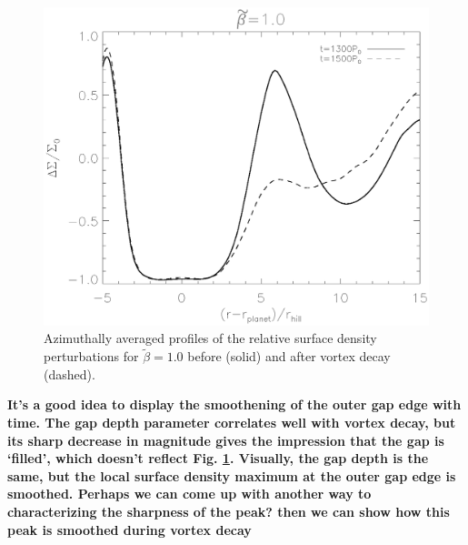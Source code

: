 \begin{figure}
  \includegraphics[width=\linewidth]{figures/gapchange}
  \caption{Azimuthally averaged profiles of the relative surface
    density perturbations for  $\tilde\beta=1.0$
    before (solid) and after vortex decay
    (dashed).
    \label{gap_smoothed}} 
\end{figure}

{\bf It's a good idea to display the smoothening of the outer gap
  edge with time. 
  The gap depth parameter correlates
  well with vortex decay, but its sharp decrease in magnitude gives
  the impression that the gap is 
  `filled', which doesn't reflect Fig. \ref{gap_smoothed}. Visually,
  the gap depth is the same, but the local surface density maximum at
  the outer gap edge is smoothed. Perhaps we can come up with another
  way to characterizing the sharpness of the peak? then we can show
  how this peak is smoothed during vortex decay
}



